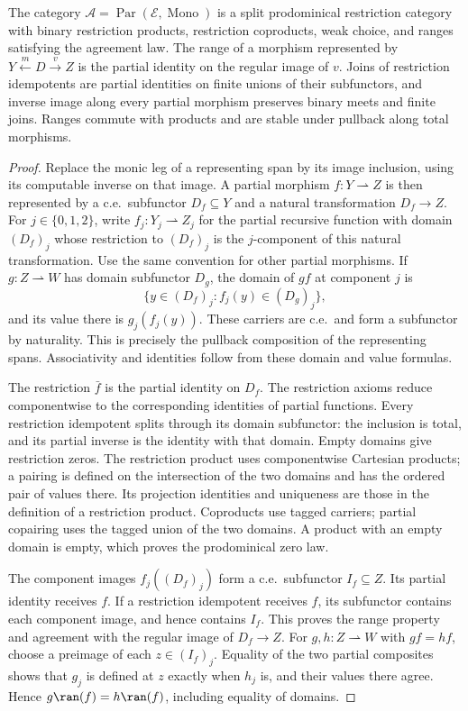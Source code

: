 \begin{proposition}\label{prop:fork-structure}
The category $\mathcal A=\operatorname{Par}(\mathcal E,
\operatorname{Mono})$ is a split prodominical restriction category
with binary restriction products, restriction coproducts, weak
choice, and ranges satisfying the agreement law. The range of a morphism
represented by $Y\xleftarrow{m}D\xrightarrow{v}Z$ is the partial
identity on the regular image of $v$.
Joins of restriction idempotents are partial identities on finite
unions of their subfunctors, and inverse image along every partial
morphism preserves binary meets and finite joins. Ranges commute with products and
are stable under pullback along total morphisms.
\end{proposition}
\begin{proof}
Replace the monic leg of a representing span by its image
inclusion, using its computable inverse on that image. A partial
morphism $f:Y\rightharpoonup Z$ is then represented by a c.e.\ subfunctor
$D_f\subseteq Y$ and a natural transformation $D_f\to Z$.
For $j\in\{0,1,2\}$, write $f_j:Y_j\rightharpoonup Z_j$ for the
partial recursive function with domain $(D_f)_j$ whose restriction
to $(D_f)_j$ is the $j$-component of this natural transformation.
Use the same convention for other partial morphisms.
If $g:Z\rightharpoonup W$ has domain subfunctor $D_g$, the domain of $gf$
at component $j$ is
\[
 \{y\in(D_f)_j:f_j(y)\in(D_g)_j\},
\]
and its value there is $g_j(f_j(y))$. These carriers are c.e.\
and form a subfunctor by naturality. This is precisely the
pullback composition of the representing spans. Associativity
and identities follow from these domain and value formulas.

The restriction $\bar f$ is the partial identity on $D_f$.
The restriction axioms reduce componentwise to the corresponding
identities of partial functions. Every restriction idempotent
splits through its domain subfunctor: the inclusion is total,
and its partial inverse is the identity with that domain.
Empty domains give restriction zeros. The restriction product
uses componentwise Cartesian products; a pairing is defined on
the intersection of the two domains and has the ordered pair
of values there. Its projection identities and uniqueness are
those in the definition of a restriction product. Coproducts
use tagged carriers; partial copairing uses the tagged union
of the two domains. A product with an empty domain is empty,
which proves the prodominical zero law.

The component images $f_j((D_f)_j)$ form a c.e.\ subfunctor
$I_f\subseteq Z$. Its partial identity receives $f$. If a restriction
idempotent receives $f$, its subfunctor contains each component image,
and hence contains $I_f$.
This proves the range property and agreement with the regular
image of $D_f\to Z$. For $g,h:Z\rightharpoonup W$ with
$gf=hf$, choose a preimage of each $z\in(I_f)_j$. Equality of the two partial composites shows
that $g_j$ is defined at $z$ exactly when $h_j$ is, and their
values there agree. Hence $g\ran(f)=h\ran(f)$, including
equality of domains.


\end{proof}
